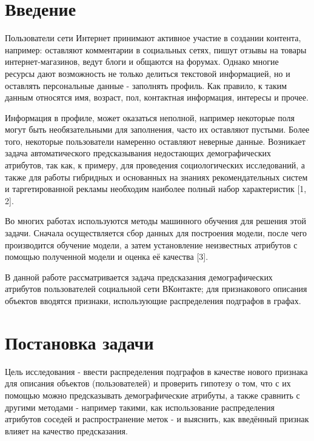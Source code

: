 \documentclass[a4paper, 12pt]{article}
\begin{document}

\setcounter{page}{1}

\section{Введение} 

Пользователи сети Интернет принимают активное участие в создании контента, например: оставляют комментарии в социальных сетях, пишут отзывы на товары интернет-магазинов, ведут блоги и общаются на форумах. Однако многие ресурсы дают возможность не только делиться текстовой информацией, но и оставлять персональные данные - заполнять профиль. Как правило, к таким данным относятся имя, возраст, пол, контактная информация, интересы и прочее.

Информация в профиле, может оказаться неполной, например некоторые поля могут быть необязательными для заполнения, часто их оставляют пустыми. Более того, некоторые пользователи намеренно оставляют неверные данные. Возникает задача автоматического предсказывания недостающих демографических атрибутов, так как, к примеру, для проведения социологических исследований, а также для работы гибридных и основанных на знаниях рекомендательных систем и таргетированной рекламы необходим наиболее полный набор характеристик [1, 2].  

Во многих работах используются методы машинного обучения для решения этой задачи. Сначала осуществляется сбор данных для построения модели, после чего производится обучение модели, а затем установление неизвестных атрибутов с помощью полученной модели и оценка её качества [3]. 

В данной работе рассматривается задача предсказания демографических атрибутов пользователей социальной сети ВКонтакте; для признакового описания объектов вводятся признаки, использующие распределения подграфов в графах. 

\section{Постановка задачи}

Цель исследования - ввести распределения подграфов в качестве нового признака для описания объектов (пользователей) и проверить гипотезу о том, что с их помощью можно предсказывать демографические атрибуты, а также сравнить с другими методами - например такими, как использование распределения атрибутов соседей и распространение меток - и выяснить, как введённый признак влияет на качество предсказания.
\end{document}
